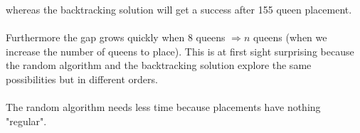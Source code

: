 whereas the backtracking solution will get a success after 155 queen placement.
\paragraph{}
Furthermore the gap grows quickly when 8 queens $\Rightarrow n$ queens (when we increase the number of queens to place). This is at first sight surprising because the random algorithm and the backtracking solution explore the same possibilities but in different orders.
\paragraph{}
The random algorithm needs less time because placements have nothing "regular".



%


